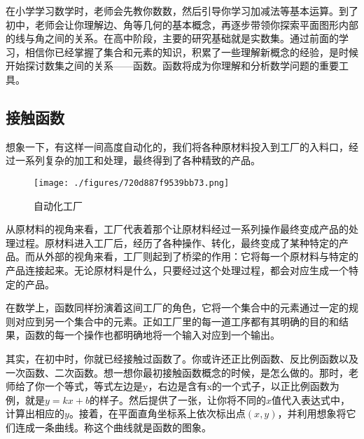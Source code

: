 

\begin{issues}
\issueDraft
\end{issues}


在小学学习数学时，老师会先教你数数，然后引导你学习加减法等基本运算。到了初中，老师会让你理解边、角等几何的基本概念，再逐步带领你探索平面图形内部的线与角之间的关系。在高中阶段，主要的研究基础就是实数集。通过前面的学习，相信你已经掌握了集合和元素的知识，积累了一些理解新概念的经验，是时候开始探讨数集之间的关系——函数。函数将成为你理解和分析数学问题的重要工具。

\subsection{接触函数}

想象一下，有这样一间高度自动化的，我们将各种原材料投入到工厂的入料口，经过一系列复杂的加工和处理，最终得到了各种精致的产品。

\begin{figure}[ht]
\centering
\texttt{[image: ./figures/720d887f9539bb73.png]}
\caption{自动化工厂} \label{fig_functi_1}
\end{figure}

从原材料的视角来看，工厂代表着那个让原材料经过一系列操作最终变成产品的处理过程。原材料进入工厂后，经历了各种操作、转化，最终变成了某种特定的产品。而从外部的视角来看，工厂则起到了桥梁的作用：它将每一个原材料与特定的产品连接起来。无论原材料是什么，只要经过这个处理过程，都会对应生成一个特定的产品。

在数学上，函数同样扮演着这间工厂的角色，它将一个集合中的元素通过一定的规则对应到另一个集合中的元素。正如工厂里的每一道工序都有其明确的目的和结果，函数的每一个操作也都明确地将一个输入对应到一个输出。

其实，在初中时，你就已经接触过函数了。你或许还正比例函数、反比例函数以及一次函数、二次函数。想一想你最初接触函数概念的时候，是怎么做的。那时，老师给了你一个等式，等式左边是y，右边是含有x的一个式子，以正比例函数为例，就是$y=kx+b$的样子。然后提供了一张，让你将不同的$x$值代入表达式中，计算出相应的$y$。接着，在平面直角坐标系上依次标出点$(x,y)$，并利用想象将它们连成一条曲线。称这个曲线就是函数的图象。

